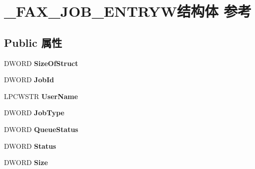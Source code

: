 \hypertarget{struct___f_a_x___j_o_b___e_n_t_r_y_w}{}\section{\+\_\+\+F\+A\+X\+\_\+\+J\+O\+B\+\_\+\+E\+N\+T\+R\+Y\+W结构体 参考}
\label{struct___f_a_x___j_o_b___e_n_t_r_y_w}
\subsection*{Public 属性}
\begin{DoxyCompactItemize}
\item 
\mbox{\label{struct___f_a_x___j_o_b___e_n_t_r_y_w_af8069560149d95c3bd5fd35d5a473a15}} 
D\+W\+O\+RD {\bfseries Size\+Of\+Struct}
\item 
\mbox{\label{struct___f_a_x___j_o_b___e_n_t_r_y_w_a5768506edc433b4c34c3a736d60fa1fd}} 
D\+W\+O\+RD {\bfseries Job\+Id}
\item 
\mbox{\label{struct___f_a_x___j_o_b___e_n_t_r_y_w_aa90dc9be7be6895d7ebf56a2c3d204fb}} 
L\+P\+C\+W\+S\+TR {\bfseries User\+Name}
\item 
\mbox{\label{struct___f_a_x___j_o_b___e_n_t_r_y_w_a6ee79f34c16073d8e1ea6dd127a1cc2b}} 
D\+W\+O\+RD {\bfseries Job\+Type}
\item 
\mbox{\label{struct___f_a_x___j_o_b___e_n_t_r_y_w_a5a3939127b517223bed02d345973f81b}} 
D\+W\+O\+RD {\bfseries Queue\+Status}
\item 
\mbox{\label{struct___f_a_x___j_o_b___e_n_t_r_y_w_a389b3896b50c50781242e0d53c438b1b}} 
D\+W\+O\+RD {\bfseries Status}
\item 
\mbox{\label{struct___f_a_x___j_o_b___e_n_t_r_y_w_a61237616c08586188a8e8eb1f26aff3c}} 
D\+W\+O\+RD {\bfseries Size}
\item 
\mbox{\label{struct___f_a_x___j_o_b___e_n_t_r_y_w_a8c75974d285584d8a014f5839c3521c0}} 

\end{DoxyCompactItemize}

